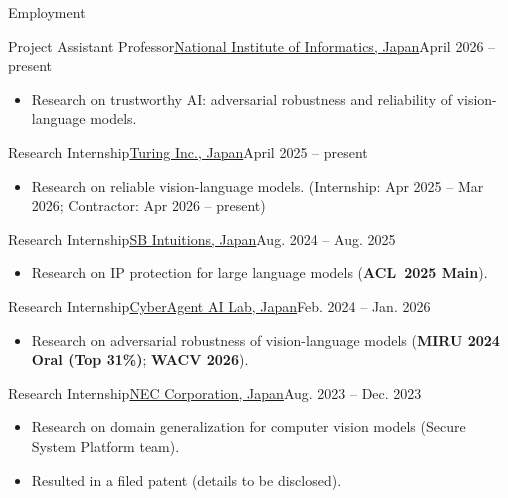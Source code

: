 \documentclass[]{mcdowellcv}
\begin{document}
\begin{cvsection}{Employment}

  \begin{cvsubsection}{Project Assistant Professor}{\href{https://www.nii.ac.jp/en/}{National Institute of Informatics, Japan}}{April 2026 -- present}
    \begin{itemize}
      \item Research on trustworthy AI: adversarial robustness and reliability of vision-language models.
    \end{itemize}
  \end{cvsubsection}

  \begin{cvsubsection}{Research Internship}{\href{https://tur.ing/en}{Turing Inc., Japan}}{April 2025 -- present}
    \begin{itemize}
      \item Research on reliable vision-language models. (Internship: Apr 2025 -- Mar 2026; Contractor: Apr 2026 -- present)
    \end{itemize}
  \end{cvsubsection}

  \begin{cvsubsection}{Research Internship}{\href{https://www.sbintuitions.co.jp/}{SB Intuitions, Japan}}{Aug. 2024 -- Aug. 2025}
    \begin{itemize}
      \item Research on IP protection for large language models (\textbf{ACL~2025 Main}).
    \end{itemize}
  \end{cvsubsection}

  \begin{cvsubsection}{Research Internship}{\href{https://research.cyberagent.ai/}{CyberAgent AI Lab, Japan}}{Feb. 2024 -- Jan. 2026}
    \begin{itemize}
      \item Research on adversarial robustness of vision-language models (\textbf{MIRU 2024 Oral (Top 31\%)}; \textbf{WACV 2026}).
    \end{itemize}
  \end{cvsubsection}

  \begin{cvsubsection}{Research Internship}{\href{https://www.nec.com/}{NEC Corporation, Japan}}{Aug. 2023 -- Dec. 2023}
    \begin{itemize}
      \item Research on domain generalization for computer vision models (Secure System Platform team).
      \item Resulted in a filed patent (details to be disclosed).
    \end{itemize}
  \end{cvsubsection}


\end{cvsection}
\end{document}
